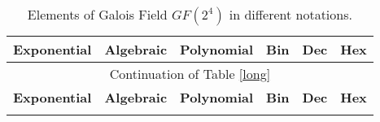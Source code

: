 \documentclass[../main.tex]{subfiles}
\begin{document}
    \begin{longtable}[c]{c | r | r | c | c | c}
        \caption{Elements of Galois Field $GF(2^4)$ in different notations.\label{long}}\\
        \hline
        \textbf{Exponential} & \textbf{Algebraic} & \textbf{Polynomial} & \textbf{Bin} & \textbf{Dec} & \textbf{Hex} \\
        \hline
        \endfirsthead

        \hline
        \multicolumn{6}{c}{Continuation of Table \ref{long}}\\
        \hline
        \textbf{Exponential} & \textbf{Algebraic} & \textbf{Polynomial} & \textbf{Bin} & \textbf{Dec} & \textbf{Hex} \\
        \hline
        \endhead

        \endfoot

        \hline
        \endlastfoot
        \label{table:galois_field_notations}


\end{longtable}
\end{document}
